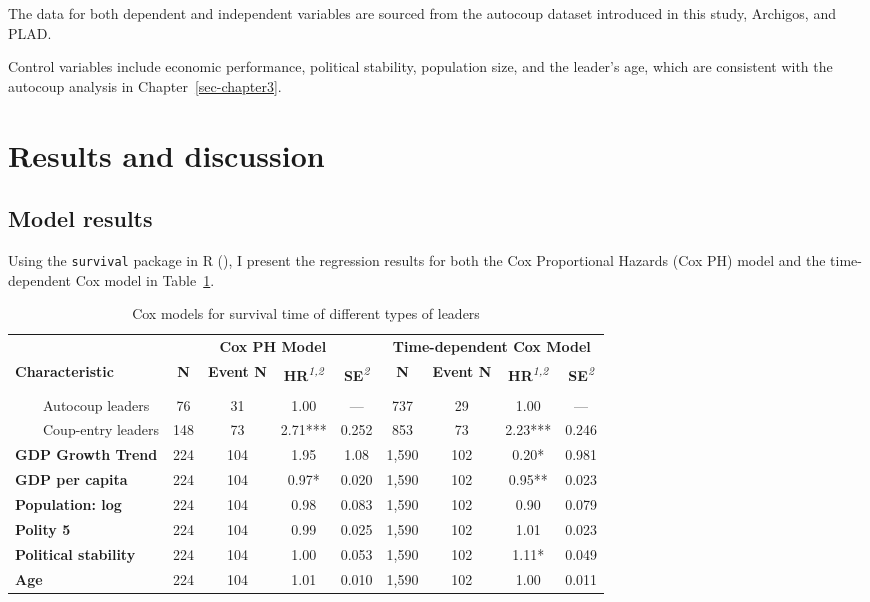 \documentclass[
  12pt,
]{report}
\begin{document}
The data for both dependent and independent variables are sourced from
the autocoup dataset introduced in this study, Archigos, and PLAD.

Control variables include economic performance, political stability,
population size, and the leader's age, which are consistent with the
autocoup analysis in Chapter~\ref{sec-chapter3}.

\section{Results and discussion}\label{results-and-discussion-1}

\subsection{Model results}\label{model-results}

Using the \texttt{survival} package in R
(), I present the regression
results for both the Cox Proportional Hazards (Cox PH) model and the
time-dependent Cox model in Table~\ref{tbl-cox}.

\begingroup
\fontsize{12.0pt}{14.4pt}\selectfont
\setlength{\LTpost}{0mm}

\begin{longtable}{lcccccccc}

\caption{\label{tbl-cox}Cox models for survival time of different types
of leaders}

\tabularnewline

\toprule
 & \multicolumn{4}{c}{\textbf{Cox PH Model}} & \multicolumn{4}{c}{\textbf{Time-dependent Cox Model}} \\ 
\cmidrule(lr){2-5} \cmidrule(lr){6-9}
\textbf{Characteristic} & \textbf{N} & \textbf{Event N} & \textbf{HR}\textsuperscript{\textit{1,2}} & \textbf{SE}\textsuperscript{\textit{2}} & \textbf{N} & \textbf{Event N} & \textbf{HR}\textsuperscript{\textit{1,2}} & \textbf{SE}\textsuperscript{\textit{2}} \\ 
\midrule\addlinespace[2.5pt]
{\bfseries Leader Type} &  &  &  &  &  &  &  &  \\ 
    Autocoup leaders & 76 & 31 & 1.00 & — & 737 & 29 & 1.00 & — \\ 
    Coup-entry leaders & 148 & 73 & 2.71*** & 0.252 & 853 & 73 & 2.23*** & 0.246 \\ 
{\bfseries GDP Growth Trend} & 224 & 104 & 1.95 & 1.08 & 1,590 & 102 & 0.20* & 0.981 \\ 
{\bfseries GDP per capita} & 224 & 104 & 0.97* & 0.020 & 1,590 & 102 & 0.95** & 0.023 \\ 
{\bfseries Population: log} & 224 & 104 & 0.98 & 0.083 & 1,590 & 102 & 0.90 & 0.079 \\ 
{\bfseries Polity 5} & 224 & 104 & 0.99 & 0.025 & 1,590 & 102 & 1.01 & 0.023 \\ 
{\bfseries Political stability} & 224 & 104 & 1.00 & 0.053 & 1,590 & 102 & 1.11* & 0.049 \\ 
{\bfseries Age} & 224 & 104 & 1.01 & 0.010 & 1,590 & 102 & 1.00 & 0.011 \\ 
\bottomrule

\end{longtable}
\end{document}
